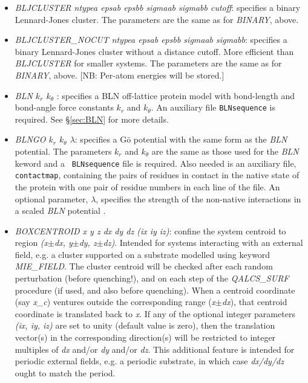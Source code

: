 \documentclass[12pt,a4paper,dvips]{article}
\begin{document}
\begin{itemize}
\item {\it BLJCLUSTER ntypea epsab epsbb sigmaab sigmabb cutoff\/}: specifies a binary Lennard-Jones
cluster. The parameters are the same as for {\it BINARY\/}, above.

\item {\it BLJCLUSTER\_NOCUT ntypea epsab epsbb sigmaab sigmabb\/}: specifies a binary Lennard-Jones
cluster without a distance cutoff. More efficient than {\it BLJCLUSTER\/} for smaller systems.
The parameters are the same as for {\it BINARY\/}, above.
[NB: Per-atom energies will be stored.]

\item {\it BLN $k_r$ $k_\theta$ \/}: specifies a BLN off-lattice protein model with
bond-length and bond-angle force constants $k_r$ and $k_\theta$.
An auxiliary file {\tt BLNsequence} is required.
See \S \ref{sec:BLN} for more details.

\item {\it BLNGO $k_r$ $k_\theta$ $\lambda$}: specifies a G\=o potential
with the same form as the {\it BLN} potential. The parameters $k_r$
and $k_\theta$ are the same as those used for the {\it BLN} keword and a {\tt
BLNsequence} file is required. Also needed is an auxiliary file, {\tt
contactmap}, containing the pairs of residues in contact in the native state of the protein
with one pair of residue numbers in each line of the file. An optional
parameter, $\lambda$, specifies the strength of the non-native interactions in a
scaled {\it BLN} potential \cite{KimKS09}.

\item {\it BOXCENTROID x y z dx dy dz (ix iy iz)}: confine the system centroid to region {\it (x$\pm$dx, y$\pm$dy, z$\pm$dz)}. Intended for systems interacting with an external field, e.g. a cluster supported on a substrate modelled using keyword {\it MIE\_FIELD}. The cluster centroid will be checked after each random perturbation (before quenching!), and on each step of the {\it QALCS\_SURF} procedure (if used, and also before quenching). When a centroid coordinate (say {\it x\_c}) ventures outside the corresponding range ({\it x$\pm$dx}), that centroid coordinate is translated back to {\it x}. If any of the optional integer parameters {\it (ix, iy, iz)} are set to unity (default value is zero), then the translation vector(s) in the corresponding direction(s) will be restricted to integer multiples of {\it dx} and/or {\it dy} and/or {\it dz}. This additional feature is intended for periodic external fields, e.g. a periodic substrate, in which case {\it dx/dy/dz} ought to match the period.


\end{itemize}
\end{document}
